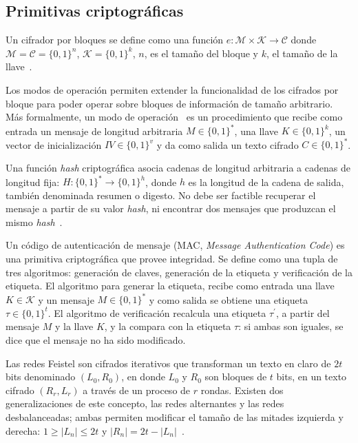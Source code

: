 \documentclass[conference]{IEEEtran}
\begin{document}
  \subsection{Primitivas criptográficas}

  Un cifrador por bloques se define como una función $ e: \mathcal{M} \times
  \mathcal{K} \rightarrow \mathcal{C} $ donde $ \mathcal{M} = \mathcal{C} = \{
    0, 1 \}^n $, $ \mathcal{K} = \{ 0, 1 \}^k $, $ n $, es el tamaño del bloque
  y $ k $, el tamaño de la llave~\cite{menezes}.

  Los modos de operación permiten extender la funcionalidad de los cifrados por
  bloque para poder operar sobre bloques de información de tamaño arbitrario.
  Más formalmente, un modo de operación~\cite{modos_de_operacion} es un
  procedimiento que recibe como entrada un mensaje de longitud arbitraria $ M
  \in \{ 0, 1 \}^*$, una llave $ K \in \{0, 1 \}^k$, un vector de inicialización
  $IV \in \{ 0, 1 \}^v $ y da como salida un texto cifrado $C \in \{ 0, 1 \}^*
  $.

  Una función \textit{hash} criptográfica asocia cadenas de longitud arbitraria
  a cadenas de longitud fija: $ H:  \{ 0, 1 \}^* \rightarrow \{ 0, 1 \}^h $,
  donde $h$ es la longitud de la cadena de salida, también denominada resumen o
  digesto.  No debe ser factible recuperar el mensaje a partir de su valor
  \textit{hash}, ni encontrar dos mensajes que produzcan el mismo
  \textit{hash}~\cite{menezes}.

  Un código de autenticación de mensaje (MAC, \textit{Message Authentication
  Code}) es una primitiva criptográfica que provee integridad. Se define como
  una tupla de tres algoritmos: generación de claves, generación de la etiqueta
  y verificación de la etiqueta. El algoritmo para generar la etiqueta, recibe
  como entrada una llave $K \in \mathcal{K}$ y un mensaje $M \in \{ 0, 1 \}^*$ y
  como salida se obtiene una etiqueta $\tau \in \{ 0, 1 \}^t$. El algoritmo de
  verificación recalcula una etiqueta $\tau^\prime$, a partir del mensaje $M$ y
  la llave $K$, y la compara con la etiqueta $\tau$: si ambas son iguales, se
  dice que el mensaje no ha sido modificado.

  Las redes Feistel son cifrados iterativos que transforman un texto en claro de
  $ 2t $ bits denominado $ (L_0, R_0) $, en donde $ L_0 $ y $ R_0 $ son bloques
  de $ t $ bits, en un texto cifrado $ (R_r, L_r) $ a través de un proceso de $
  r $ rondas. Existen dos generalizaciones de este concepto, las redes
  alternantes y las redes desbalanceadas; ambas permiten modificar el tamaño de
  las mitades izquierda y derecha: $ 1 \geq | L_n | \leq 2t $ y $ | R_n | = 2t -
  | L_n | $~\cite{DBLP:conf/fse/SchneierK96}.
\end{document}
